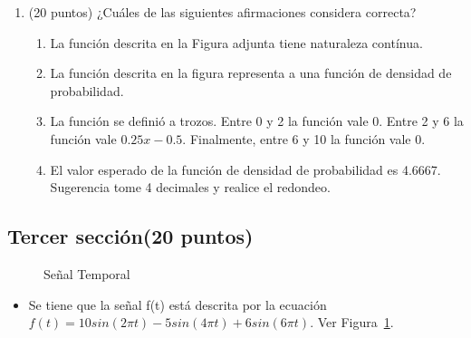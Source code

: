 \documentclass[12pt,a4paper]{article}
\providecommand{\tightlist}{%
  \setlength{\itemsep}{0pt}\setlength{\parskip}{0pt}}\usepackage{longtable,booktabs,array}
\providecommand{\tightlist}{%
  \setlength{\itemsep}{0pt}\setlength{\parskip}{2pt}}
\begin{document}
\begin{enumerate}
\tightlist
\item
  (20 puntos) ¿Cuáles de las siguientes afirmaciones considera correcta?

  \begin{enumerate}
  \tightlist
  \item
    La función descrita en la Figura adjunta tiene naturaleza contínua.
  \item
    La función descrita en la figura representa a una función de
    densidad de probabilidad.
  \item
    La función se definió a trozos. Entre 0 y 2 la función vale 0. Entre
    2 y 6 la función vale \(0.25x - 0.5\). Finalmente, entre 6 y 10 la
    función vale 0.
  \item
    El valor esperado de la función de densidad de probabilidad es
    4.6667. Sugerencia tome 4 decimales y realice el redondeo.
  \end{enumerate}
\end{enumerate}

\subsection{Tercer sección(20 puntos)}\label{tercer-secciuxf3n20-puntos}

\begin{figure}


\caption{\label{fig-señal}Señal Temporal}

\end{figure}%

\begin{itemize}
\tightlist
\item
  Se tiene que la señal f(t) está descrita por la ecuación
  \(f\left(t\right) = 10sin\left(2\pi t\right) - 5sin\left(4\pi t\right)+6sin\left(6\pi t\right)\).
  Ver Figura~\ref{fig-señal}.
\end{itemize}
\end{document}
